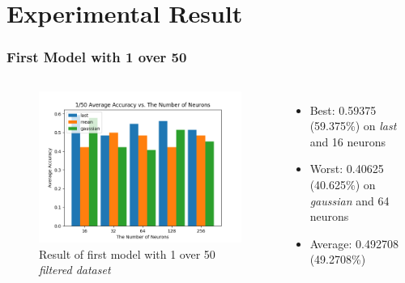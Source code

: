 \documentclass{beamer}
\begin{document}

\section{Experimental Result}

\begin{frame}
\frametitle{First Model with 1 over 50}
\begin{columns}
\begin{figure}[tb]
    \centering
    \includegraphics[width=\textwidth]{../paper/pictures/result_pictures/filtered_1_50_result.png}
    \caption{Result of first model with 1 over 50 {\em filtered dataset}}
    \label{fig:filter_1_50}
\end{figure}

\begin{itemize}
\item Best: 0.59375 (59.375\%) on {\em last} and 16 neurons
\item Worst: 0.40625 (40.625\%) on {\em gaussian} and 64 neurons
\item Average: 0.492708 (49.2708\%)
\end{itemize}
\end{columns}
\end{frame}
\end{document}
